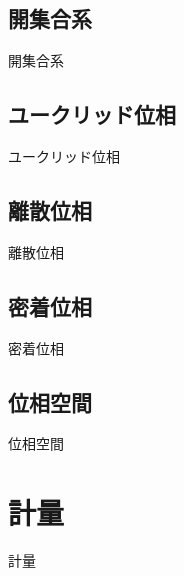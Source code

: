\newpage


\subsection{開集合系}

開集合系

\newpage


\subsection{ユークリッド位相}

ユークリッド位相

\newpage


\subsection{離散位相}

離散位相

\newpage


\subsection{密着位相}

密着位相

\newpage


\subsection{位相空間}

位相空間

\newpage


\section{計量}

計量

\newpage
